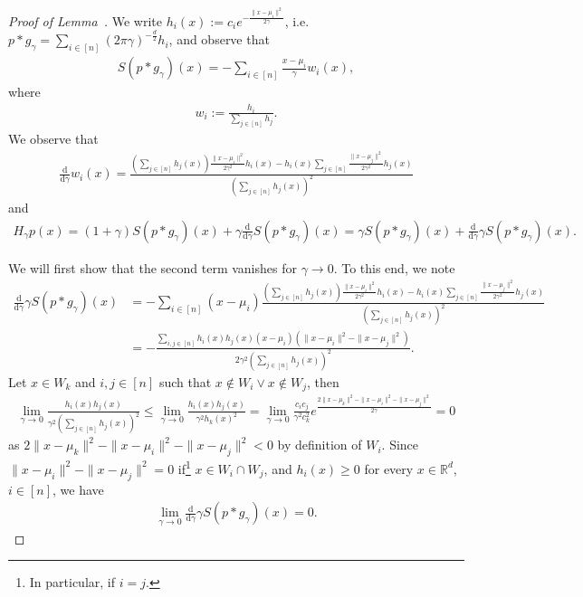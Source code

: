 \documentclass{article}
\newcommand{\R}{\mathbb{R}}
\theoremstyle{plain}
\theoremstyle{definition}
\theoremstyle{remark}
\renewcommand{\d}{\mathrm{d}}
\newcommand{\ddgamma}{\tfrac{\d}{\d\gamma}}
\newcommand{\sumi}{\sum_{i\in[n]}}
\newcommand{\sumj}{\sum_{j\in[n]}}
\begin{document}
\begin{proof}[Proof of Lemma~]
     We write $h_i(x):=c_ie^{-\frac{\|x-\mu_i\|^2}{2\gamma}}$, i.e.\@ $p*g_\gamma = \sumi (2\pi\gamma)^{-\frac{d}{2}}  h_i$, 
     and observe that
     \begin{align*}
        S(p*g_\gamma)(x)=-\sum_{i\in[n]}\tfrac{x-\mu_i}{\gamma}w_i(x),
     \end{align*}
     where
     \begin{align*}
         w_i:=\tfrac{h_i}{\sumj{h_j}}.
     \end{align*}
     We observe that
     \begin{align*}
         \ddgamma w_i(x)=\frac{(\sumj h_j(x))\tfrac{\|x-\mu_i\|^2}{2\gamma^2}h_i(x)-h_i(x)\sumj\tfrac{\|x-\mu_j\|^2}{2\gamma^2}h_j(x)}{(\sumj h_j(x))^2}
     \end{align*}
     and
     \begin{align*}
         H_\gamma p(x)
         =(1+\gamma)S(p*g_\gamma)(x) + \gamma \ddgamma S(p*g_\gamma)(x)=\gamma S(p*g_\gamma)(x) +  \ddgamma \gamma S(p*g_\gamma)(x).
    \end{align*}
    
 We will first show that the second term vanishes for $\gamma\to 0$. To this end, we note
    \begin{align*}
         \ddgamma \gamma S(p*g_\gamma)(x)
         &=- \sumi(x-\mu_i)\frac{(\sumj h_j(x))\tfrac{\|x-\mu_i\|^2}{2\gamma^2}h_i(x)-h_i(x)\sumj\tfrac{\|x-\mu_j\|^2}{2\gamma^2}h_j(x)}{(\sumj h_j(x))^2}\\
         &=-\frac{\sum_{i,j\in[n]} h_i(x)h_j(x)(x-\mu_i)(\|x-\mu_i\|^2-\|x-\mu_j\|^2)}{2\gamma^2(\sumj h_j(x))^2}.
     \end{align*}
     Let $x\in W_k$ and $i,j\in[n]$ such that $x\notin W_i \vee x\notin W_j $, then
     \begin{align*}
         \lim_{\gamma\to 0} \frac{h_i(x)h_j(x)}{\gamma^2(\sumj h_j(x))^2}
         \leq \lim_{\gamma\to 0} \frac{h_i(x)h_j(x)}{\gamma^2h_k(x)^2}
         = \lim_{\gamma\to 0} \tfrac{c_ic_j}{\gamma^2 c_k^2}e^{\frac{2\|x-\mu_k\|^2-\|x-\mu_i\|^2 -\|x-\mu_j\|^2}{2\gamma}}=0
     \end{align*}
     as $2\|x-\mu_k\|^2-\|x-\mu_i\|^2 -\|x-\mu_j\|^2 <0$ by definition of $W_i$. Since $\|x-\mu_i\|^2-\|x-\mu_j\|^2 = 0$ if\footnote{In particular, if $i=j$.} $x\in W_i\cap W_j$, and $h_i(x)\geq0$ for every $x\in\R^d$, $i\in[n]$, we have
     \begin{align*}
         \lim_{\gamma\to 0}\ddgamma \gamma S(p*g_\gamma)(x)=0.
     \end{align*}
     

\end{proof}
\end{document}

